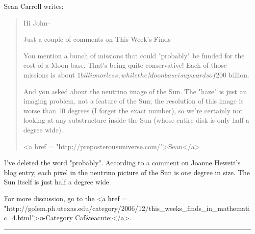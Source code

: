 Sean Carroll writes:

\begin{quote}
Hi John-- 

Just a couple of comments on This Week's Finds--

You mention a bunch of missions that could "probably" be funded for
the cost of a Moon base.  That's being quite conservative!  Each of
those missions is about $1 billion or less, while the Moon base is
upwards of $200 billion.

And you asked about the neutrino image of the Sun.  The "haze" is just
an imaging problem, not a feature of the Sun; the resolution of this
image is worse than 10 degrees (I forget the exact number), so we're
certainly not looking at any substructure inside the Sun (whose entire
disk is only half a degree wide).

<a href = "http://preposterousuniverse.com/">Sean</a>
\end{quote}
    

I've deleted the word "probably".  According to
a comment on Joanne Hewett's blog entry, each pixel in the
neutrino picture of the Sun is one degree in size.  The 
Sun itself is just half a degree wide.

For more discussion, go to the <a href = "http://golem.ph.utexas.edu/category/2006/12/this_weeks_finds_in_mathematic_4.html">\emph{n}-Category
Caf&eacute;</a>.

\par\noindent\rule{\textwidth}{0.4pt}


